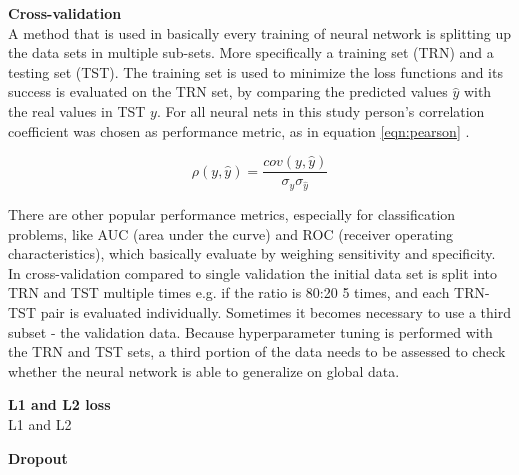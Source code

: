 \textbf{Cross-validation} \\

A method that is used in basically every training of neural network is splitting up the data sets in multiple
sub-sets.  More specifically a training set (TRN) and a testing set (TST). The training set is used to
minimize the loss functions and its success is evaluated on the TRN set, by comparing the predicted values
$\hat{y}$ with the real values in TST $y$.  For all neural nets in this study person's correlation coefficient
was chosen as performance metric, as in equation \ref{eqn:pearson} \cite{soper1917distribution}.

\begin{equation}
\rho(y,\hat{y})  =  \frac{cov(y,\hat{y})}{  \sigma_y \sigma_{\hat{y}}}
  \label{eqn:pearson}
\end{equation}

There are other popular performance metrics, especially for classification problems, like AUC (area under the
curve) and ROC (receiver operating characteristics), which basically evaluate by weighing sensitivity and
specificity.  In cross-validation compared to single validation the initial data set is split into TRN and TST
multiple times e.g. if the ratio is 80:20 5 times, and each TRN-TST pair is evaluated individually. Sometimes
it becomes necessary to use a third subset - the validation data. Because hyperparameter tuning is performed
with the TRN and TST sets, a third portion of the data needs to be assessed to check whether the neural
network is able to generalize on global data.

\textbf{L1 and L2 loss} \\
 
L1 and L2


\textbf{Dropout}


